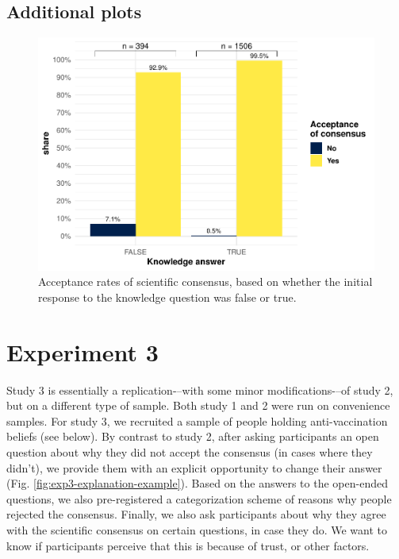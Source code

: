 \documentclass[
  doc,floatsintext]{apa6}
\begin{document}
\subsection{Additional plots}\label{additional-plots-1}



\begin{figure}
\centering
\includegraphics{output/figures/exp2-conditional-acceptance.pdf}
\caption{\label{fig:exp2-conditional-acceptance}Acceptance rates of scientific consensus, based on whether the initial response to the knowledge question was false or true.}
\end{figure}




\clearpage

\section{Experiment 3}\label{exp3}

Study 3 is essentially a replication-\/--with some minor modifications-\/--of study 2, but on a different type of sample. Both study 1 and 2 were run on convenience samples. For study 3, we recruited a sample of people holding anti-vaccination beliefs (see below). By contrast to study 2, after asking participants an open question about why they did not accept the consensus (in cases where they didn't), we provide them with an explicit opportunity to change their answer (Fig. \ref{fig:exp3-explanation-example}). Based on the answers to the open-ended questions, we also pre-registered a categorization scheme of reasons why people rejected the consensus. Finally, we also ask participants about why they agree with the scientific consensus on certain questions, in case they do. We want to know if participants perceive that this is because of trust, or other factors.
\end{document}
